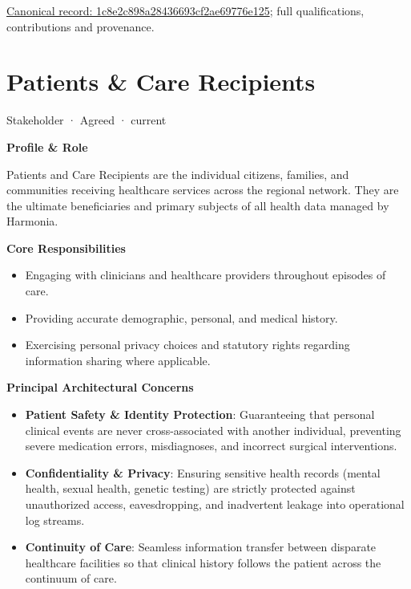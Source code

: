 {\footnotesize \href{../../../../continuum/motivation/stakeholder/1c8e2c898a28436693cf2ae69776e125.md}{Canonical record: 1c8e2c898a28436693cf2ae69776e125}; full qualifications, contributions and provenance.}\par
\section{Patients \& Care Recipients}

\label{element:ea5a315450ce4cfb87417263560c2b6d}
{\small Stakeholder · Agreed · current}\par

\par\medskip\textbf{Profile \& Role}\par


Patients and Care Recipients are the individual citizens, families, and communities receiving healthcare services across the regional network. They are the ultimate beneficiaries and primary subjects of all health data managed by Harmonia.



\par\medskip\textbf{Core Responsibilities}\par


\begin{itemize}


\item Engaging with clinicians and healthcare providers throughout episodes of care.

\item Providing accurate demographic, personal, and medical history.

\item Exercising personal privacy choices and statutory rights regarding information sharing where applicable.

\end{itemize}


\par\medskip\textbf{Principal Architectural Concerns}\par


\begin{itemize}


\item \textbf{Patient Safety \& Identity Protection}: Guaranteeing that personal clinical events are never cross-associated with another individual, preventing severe medication errors, misdiagnoses, and incorrect surgical interventions.

\item \textbf{Confidentiality \& Privacy}: Ensuring sensitive health records (mental health, sexual health, genetic testing) are strictly protected against unauthorized access, eavesdropping, and inadvertent leakage into operational log streams.

\item \textbf{Continuity of Care}: Seamless information transfer between disparate healthcare facilities so that clinical history follows the patient across the continuum of care.

\end{itemize}

